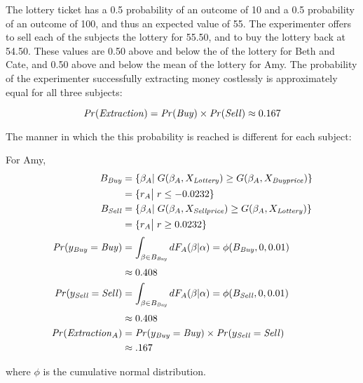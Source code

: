 \documentclass[../main.tex]{subfiles}
\begin{document}
The lottery ticket has a 0.5 probability of an outcome of 10 and a 0.5 probability of an outcome of 100, and thus an expected value of 55.
The experimenter offers to sell each of the subjects the lottery for 55.50, and to buy the lottery back at 54.50.
These values are 0.50 above and below the {\CE} of the lottery for Beth and Cate, and  0.50 above and below the mean {\CE} of the lottery for Amy.
The probability of the experimenter successfully extracting money costlessly is approximately equal for all three subjects:

\begin{equation}
	\label{eq2:pr.extraction}
	{\ensuremath{\mathit{Pr}}}(\mathit{Extraction}) = {\mathit{Pr}}(\mathit{Buy}) \times {\ensuremath{\mathit{Pr}}}(\mathit{Sell}) \approx 0.167
\end{equation}

\noindent The manner in which the this probability is reached is different for each subject:

\noindent For Amy,
\begin{align}
	\label{eq2:Amy}
	\begin{split}
		B_{\mathit{Buy}} &= \{ \beta_A |\; G(\beta_A,X_{\mathit{Lottery}}) \geq G(\beta_A,X_{\mathit{Buy price}})\}\\
		&= \{ r_A \big|\; r \leq -0.0232 \} \\
		B_{\mathit{Sell}} &= \{ \beta_A |\; G(\beta_A,X_{\mathit{Sell price}}) \geq G(\beta_A,X_{\mathit{Lottery}})\}\\
		&= \{ r_A \big|\; r \geq 0.0232 \} \\[0.5ex]
		{\ensuremath{\mathit{Pr}}}(y_{\mathit{Buy}}=\mathit{Buy}) &= \int_{\beta \in B_{\mathit{Buy}}} dF_A(\beta|\alpha) = \phi(B_{\mathit{Buy}},0,0.01)\\[0.5ex]
		&\approx 0.408 \\
		{\mathit{Pr}}(y_{\mathit{Sell}}=\mathit{Sell}) &= \int_{\beta \in B_{\mathit{Buy}}} dF_A(\beta|\alpha) = \phi(B_{\mathit{Sell}},0,0.01)\\[0.5ex]
		&\approx 0.408 \\
		{\mathit{Pr}}(\mathit{Extraction}_A) &= {\mathit{Pr}}(y_{\mathit{Buy}} = \mathit{Buy}) \times {\ensuremath{\mathit{Pr}}}(y_{\mathit{Sell}} = \mathit{Sell})\\
		&\approx .167
	\end{split}
\end{align}

\noindent where $\phi$ is the cumulative normal distribution.
\end{document}
